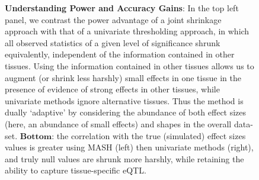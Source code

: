 \begin{figure}[htbp]
\caption{\textbf{Understanding Power and Accuracy Gains}: In the top left panel, we contrast the power advantage of a joint shrinkage approach with that of a univariate thresholding approach, in which all observed statistics of a given level of significance shrunk equivalently, independent of the information contained in other tissues. Using the information contained in other tissues allows us to augment (or shrink less harshly) small effects in one tissue in the presence of evidence of strong effects in other tissues, while univariate methods ignore alternative tissues. Thus the method is dually `adaptive' by considering the abundance of both effect sizes (here, an abundance of small effects) and shapes in the overall data-set. $\textbf{Bottom}$: the correlation with the true (simulated) effect sizes values is greater using MASH (left) then univariate methods (right), and truly null values are shrunk more harshly, while retaining the ability to capture tissue-specific eQTL.}
 \label{fig:simulationscatter}
\end{figure}\newline

